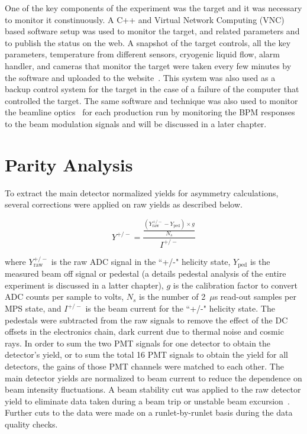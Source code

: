 One of the key components of the experiment was the target and it was necessary to monitor it constinuously. A C++ and Virtual Network Computing (VNC) based software setup was used to monitor the target, and related parameters and to publish the status on the web. 
A snapshot of the target controls, all the key parameters, temperature from different sensors, cryogenic liquid flow, alarm handler, and cameras that monitor the target were taken every few minutes by the software and uploaded to the website~\cite{website:target}. This system was also used as a backup control system for the target in the case of a failure of the computer that controlled the target. 
The same software and technique was also used to monitor the beamline optics~\cite{website:bmod} for each production run by monitoring the BPM responses to the beam modulation signals and will be discussed in a later chapter. 

\section{Parity Analysis}%
\label{Parity Analysis}


To extract the main detector normalized yields for asymmetry calculations, several corrections were applied on raw yields as described below.

\begin{equation} \label{equ:yieldDefinition}
Y^{+/-} = \frac{\displaystyle \frac{(Y_{\textrm{raw}}^{+/-} - Y_{\textrm{ped}})\times g}{N_{s}} }{I^{+/-}}
\end{equation}

where $Y_{\textrm{raw}}^{+/-}$ is the raw ADC signal in the ``+/-" helicity state, $Y_{\textrm{ped}}$ is the measured beam off signal or pedestal (a details pedestal analysis of the entire experiment is discussed in a latter chapter), $g$ is the calibration factor to convert ADC counts per sample to volts, $N_{s}$ is the number of 2~$\mu$s read-out samples per MPS state, and $I^{+/-}$ is the beam current for the ``+/-" helicity state. 
The pedestals were subtracted from the raw signals to remove the effect of the DC offsets in the electronics chain, dark current due to thermal noise and cosmic rays.
In order to sum the two PMT signals for one detector to obtain the detector’s yield, or to sum the total 16 PMT signals to obtain the yield for all detectors, the gains of those PMT channels were matched to each other. 
The main detector yields are normalized to beam current to reduce the dependence on beam intensity fluctuations.
A beam stability cut was applied to the raw detector yield to eliminate data taken during a beam trip or unstable beam excursion~\cite{rakitha_qweak}. Further cuts to the data were made on a runlet-by-runlet basis during the data quality checks. 


